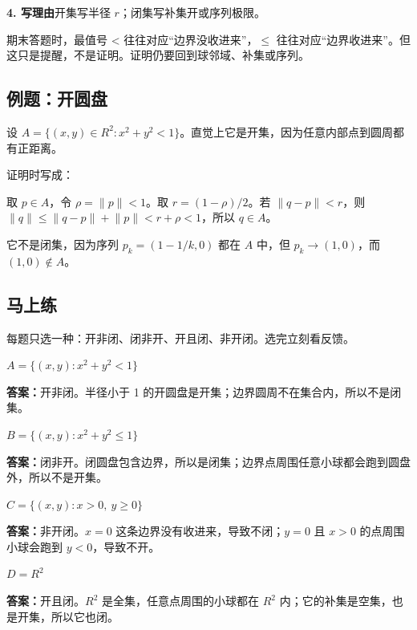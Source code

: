 \begin{conceptbox}
\textbf{4. 写理由}开集写半径 \(r\)；闭集写补集开或序列极限。
\end{conceptbox}

期末答题时，最值号 < 往往对应“边界没收进来”，\(\le\) 往往对应“边界收进来”。但这只是提醒，不是证明。证明仍要回到球邻域、补集或序列。

\subsection*{例题：开圆盘}

设 \(A=\{(x,y)\in R^2:x^2+y^2<1\}\)。直觉上它是开集，因为任意内部点到圆周都有正距离。

证明时写成：

取 \(p\in A\)，令 \(\rho=\lVert p\rVert<1\)。取 \(r=(1-\rho)/2\)。若 \(\lVert q-p\rVert<r\)，则 \(\lVert q\rVert\le \lVert q-p\rVert+\lVert p\rVert<r+\rho<1\)，所以 \(q\in A\)。

它不是闭集，因为序列 \(p_k=(1-1/k,0)\) 都在 \(A\) 中，但 \(p_k\to(1,0)\)，而 \((1,0)\notin A\)。

\subsection*{马上练}

每题只选一种：开非闭、闭非开、开且闭、非开闭。选完立刻看反馈。

\begin{quickcheck}
\(A=\{(x,y):x^2+y^2<1\}\)

\tcblower
\textbf{答案：}开非闭。半径小于 1 的开圆盘是开集；边界圆周不在集合内，所以不是闭集。
\end{quickcheck}

\begin{quickcheck}
\(B=\{(x,y):x^2+y^2\le1\}\)

\tcblower
\textbf{答案：}闭非开。闭圆盘包含边界，所以是闭集；边界点周围任意小球都会跑到圆盘外，所以不是开集。
\end{quickcheck}

\begin{quickcheck}
\(C=\{(x,y):x>0,\ y\ge0\}\)

\tcblower
\textbf{答案：}非开闭。\(x=0\) 这条边界没有收进来，导致不闭；\(y=0\) 且 \(x>0\) 的点周围小球会跑到 \(y<0\)，导致不开。
\end{quickcheck}

\begin{quickcheck}
\(D=R^2\)

\tcblower
\textbf{答案：}开且闭。\(R^2\) 是全集，任意点周围的小球都在 \(R^2\) 内；它的补集是空集，也是开集，所以它也闭。
\end{quickcheck}

